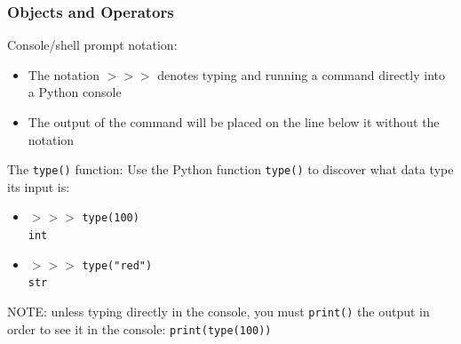 \documentclass{beamer}
\newcommand{\code}[1]{\texttt{#1}}
\newcommand{\shp}{$>>>$ }
\begin{document}
\begin{frame}%
	\frametitle{Objects and Operators}
	
	\begin{alertblock}{Console/shell prompt notation:}
			\begin{itemize}
				\item The notation \shp denotes typing and running a command directly into a Python console
				\item The output of the command will be placed on the line below it without the notation
			\end{itemize}
	\end{alertblock}
	
	\begin{alertblock}{The \code{type()} function:}
			Use the Python function \code{type()} to discover what data type its input is:
			\begin{itemize}
				\item \shp \code{type(100)} \\ \code{int}
				\item \shp \code{type("red")} \\ \code{str}
			\end{itemize}
			NOTE: unless typing directly in the console, you must \code{print()} the output in order to see it in the console: \code{print(type(100))}
	\end{alertblock}
	
\end{frame}
\end{document}
